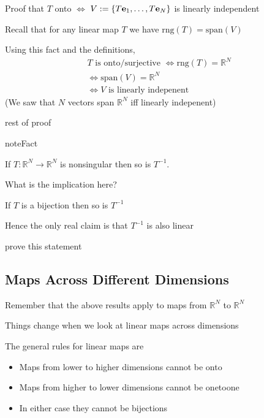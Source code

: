 \documentclass[letterpaper,10pt,english]{jupyterBook}
\begin{document}
\sphinxAtStartPar
Proof that \(T\) onto \(\iff\) \(V := \{T{\bf e}_1, \ldots, T{\bf e}_N\}\) is
linearly independent

\sphinxAtStartPar
Recall that for any linear map \(T\) we have \(\mathrm{rng}(T) = \mathrm{span}(V)\)

\sphinxAtStartPar
Using this fact and the definitions,
\begin{equation*}
\begin{split}
%
T \text{ is onto/surjective } 
\iff \mathrm{rng}(T) = \mathbb{R}^N
\\
\iff \mathrm{span}(V) = \mathbb{R}^N
\\
\iff V \text{ is linearly indepenent}
%
\end{split}
\end{equation*}
\sphinxAtStartPar
(We saw that \(N\) vectors span \(\mathbb{R}^N\) iff linearly indepenent)

\sphinxAtStartPar
{} rest of proof

\begin{sphinxadmonition}{note}{Fact}

\sphinxAtStartPar
If \(T \colon \mathbb{R}^N \to \mathbb{R}^N\) is nonsingular then so is \(T^{-1}\).
\end{sphinxadmonition}

\sphinxAtStartPar
What is the implication here?

\sphinxAtStartPar
If \(T\) is a bijection then so is \(T^{-1}\)

\sphinxAtStartPar
Hence the only real claim is that \(T^{-1}\) is also linear

\sphinxAtStartPar
{} prove this statement


\subsection{Maps Across Different Dimensions}
\label{\detokenize{05.linear_algebra:maps-across-different-dimensions}}
\sphinxAtStartPar
Remember that the above results apply to maps from \(\mathbb{R}^N\) to \(\mathbb{R}^N\)

\sphinxAtStartPar
Things change when we look at linear maps across dimensions

\sphinxAtStartPar
The general rules for linear maps are
\begin{itemize}
\item {} 
\sphinxAtStartPar
Maps from lower to higher dimensions cannot be onto

\item {} 
\sphinxAtStartPar
Maps from higher to lower dimensions cannot be one\sphinxhyphen{}to\sphinxhyphen{}one

\item {} 
\sphinxAtStartPar
In either case they cannot be bijections

\end{itemize}
\end{document}
